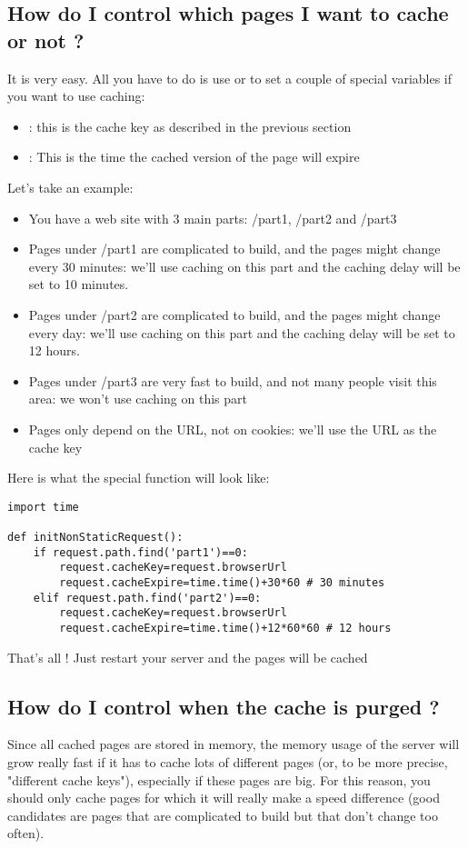 \documentclass{manual}
\begin{document}
\subsection{How do I control which pages I want to cache or not ?}
It is very easy. All you have to do is use  or  to set a couple of
special variables if you want to use caching:
\begin{itemize}
\item
{}:
this is the cache key as described in the previous section
\item
{}:
This is the time the cached version of the page will expire
\end{itemize}
Let's take an example:
\begin{itemize}
\item
You have a web site with 3 main parts: /part1, /part2 and /part3
\item
Pages under /part1 are complicated to build, and the pages might change every 30 minutes: we'll use caching on this part and
the caching delay will be set to 10 minutes.
\item
Pages under /part2 are complicated to build, and the pages might change every day: we'll use caching on this part and the
caching delay will be set to 12 hours.
\item
Pages under /part3 are very fast to build, and not many people visit this area: we won't use caching on this part
\item
Pages only depend on the URL, not on cookies: we'll use the URL as the cache key
\end{itemize}
Here is what the  special function will look like:
\begin{verbatim}
import time

def initNonStaticRequest():
    if request.path.find('part1')==0:
        request.cacheKey=request.browserUrl
        request.cacheExpire=time.time()+30*60 # 30 minutes
    elif request.path.find('part2')==0:
        request.cacheKey=request.browserUrl
        request.cacheExpire=time.time()+12*60*60 # 12 hours
\end{verbatim}
That's all ! Just restart your server and the pages will be cached

\subsection{How do I control when the cache is purged ?}
Since all cached pages are stored in memory, the memory usage of the server will grow really fast if it has
to cache lots of different pages (or, to be more precise, "different cache keys"), especially if these pages
are big. For this reason, you should only cache
pages for which it will really make a speed difference (good candidates are pages that are complicated to
build but that don't change too often).
\end{document}
